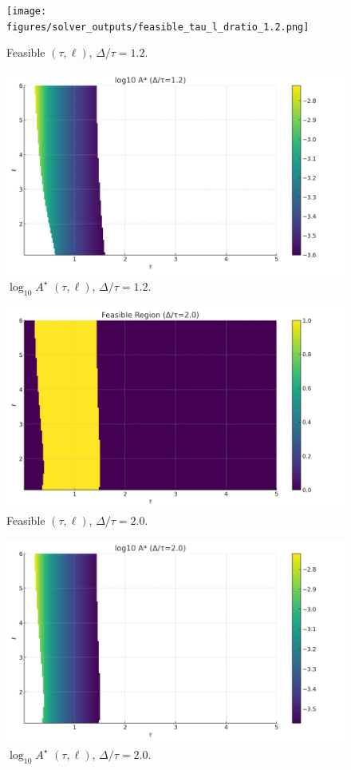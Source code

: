 \documentclass[11pt]{article}
\begin{document}
\begin{figure}[h]\centering\texttt{[image: figures/solver\_outputs/feasible\_tau\_l\_dratio\_1.2.png]}\caption{Feasible $(\tau,\ell)$, $\Delta/\tau=1.2$.}\end{figure}
\begin{figure}[h]\centering\includegraphics[width=0.85\linewidth]{figures/sweeps/Astar_tau_l_dratio_1.2.png}\caption{$\log_{10}A^\star$ $(\tau,\ell)$, $\Delta/\tau=1.2$.}\end{figure}
\begin{figure}[h]\centering\includegraphics[width=0.85\linewidth]{figures/sweeps/feasible_tau_l_dratio_2.0.png}\caption{Feasible $(\tau,\ell)$, $\Delta/\tau=2.0$.}\end{figure}
\begin{figure}[h]\centering\includegraphics[width=0.85\linewidth]{figures/sweeps/Astar_tau_l_dratio_2.0.png}\caption{$\log_{10}A^\star$ $(\tau,\ell)$, $\Delta/\tau=2.0$.}\end{figure}
\end{document}
